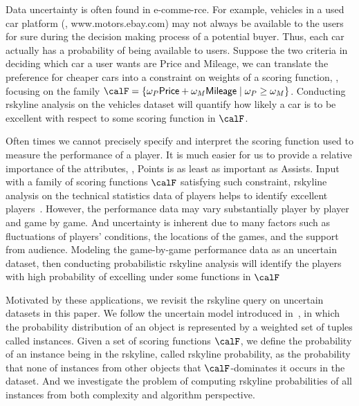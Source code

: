 Data uncertainty is often found in e-comme-rce.
For example, vehicles in a used car platform (\eg, www.motors.ebay.com) may not always be available to the users for sure during the decision making process of a potential buyer.
Thus, each car actually has a probability of being available to users.
Suppose the two criteria in deciding which car a user wants are \textsf{Price} and \textsf{Mileage}, we can translate the preference for cheaper cars into a constraint on weights of a scoring function, \eg, focusing on the family $\calF = \{\omega_P \textsf{Price} + \omega_M \textsf{Mileage} \mid \omega_P \ge \omega_M \}$.
Conducting rskyline analysis on the vehicles dataset will quantify how likely a car is to be excellent with respect to some scoring function in $\calF$.

Often times we cannot precisely specify and interpret the scoring function used to measure the performance of a player.
It is much easier for us to provide a relative importance of the attributes, \eg, \textsf{Points} is as least as important as \textsf{Assists}.
Input with a family of scoring functions $\calF$ satisfying such constraint, rskyline analysis on the technical statistics data of players helps to identify excellent players~\cite{DBLP:journals/pvldb/CiacciaM17}.
However, the performance data may vary substantially player by player and game by game.
And uncertainty is inherent due to many factors such as fluctuations of players’ conditions, the locations of the games, and the support from audience.
Modeling the game-by-game performance data as an uncertain dataset, then conducting probabilistic rskyline analysis will identify the players with high probability of excelling under some functions in $\calF$

Motivated by these applications, we revisit the rskyline query on uncertain datasets in this paper.
We follow the uncertain model introduced in~\cite{DBLP:conf/pods/AtallahQ09}, in which the probability distribution of an object is represented by a weighted set of tuples called instances.
Given a set of scoring functions $\calF$, we define the probability of an instance being in the rskyline, called rskyline probability, as the probability that none of instances from other objects that $\calF$-dominates it occurs in the dataset.
And we investigate the problem of computing rskyline probabilities of all instances from both complexity and algorithm perspective.

